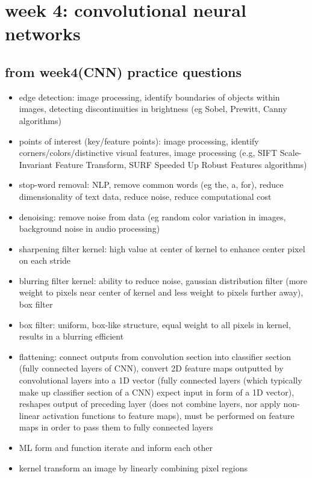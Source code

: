 \documentclass[10pt]{article}
\begin{document}
\pagebreak
\section*{week 4: convolutional neural networks}

\subsection*{from week4(CNN) practice questions}
\begin{itemize}[label=\(\star\), leftmargin=1em, itemsep=-0.3em]
    \item edge detection: image processing, identify boundaries of objects within images, detecting discontinuities in brightness (eg Sobel, Prewitt, Canny algorithms)
    \item points of interest (key/feature points): image processing, identify corners/colors/distinctive visual features, image processing (e.g, SIFT Scale-Invariant Feature Transform, SURF Speeded Up Robust Features algorithms)
    \item stop-word removal: NLP, remove common words (eg the, a, for), reduce dimensionality of text data, reduce noise, reduce computational cost
    \item denoising: remove noise from data (eg random color variation in images, background noise in audio processing)
    \item sharpening filter kernel: high value at center of kernel to enhance center pixel on each stride
    \item blurring filter kernel: ability to reduce noise, gaussian distribution filter (more weight to pixels near center of kernel and less weight to pixels further away), box filter
    \item box filter: uniform, box-like structure, equal weight to all pixels in kernel, results in a blurring efficient
    \item flattening: connect outputs from convolution section into classifier section (fully connected layers of CNN), convert 2D feature maps outputted by convolutional layers into a 1D vector (fully connected layers (which typically make up classifier section of a CNN) expect input in form of a 1D vector), reshapes output of preceding layer (does not combine layers, nor apply non-linear activation functions to feature maps),  must be performed on feature maps in order to pass them to fully connected layers
    \item ML form and function iterate and inform each other
    \item kernel transform an image by linearly combining pixel regions
\end{itemize}
\end{document}
